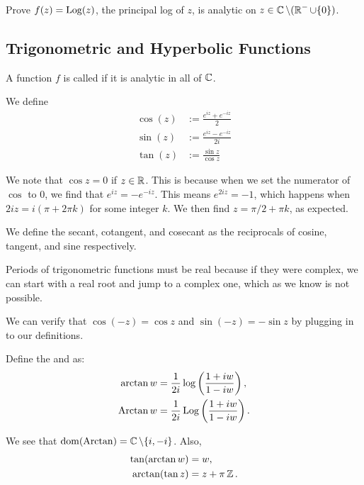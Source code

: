 \documentclass[notes]{subfile}
\begin{document}
\begin{exercise}
    Prove $f(z) = {\operatorname{Log}}(z)$, the principal log of $z$, is analytic on $z \in \operatorname{\mathbb{C}} \setminus (\operatorname{\mathbb{R}}^- \cup \{0\})$.
\end{exercise}

\subsection{Trigonometric and Hyperbolic Functions}

\begin{definition}
    A function $f$ is called  if it is analytic in all of $\operatorname{\mathbb{C}}$.
\end{definition}

We define
\begin{align*}
    \cos (z) &:= \frac{e^{iz} + e^{-iz}}{2} \\
    \sin (z) &:= \frac{e^{iz} - e^{-iz}}{2i} \\
    \tan (z) &:= \frac{\sin z}{\cos z}
\end{align*}


\noindent 
We note that $\cos z = 0$ if $z \in \operatorname{\mathbb{R}}$.  This is because when we set the numerator of $\cos$ to $0$, we find
that $e^{iz} = -e^{-iz}$. 
This means $e^{2iz} = -1$, which happens when $2iz = i(\pi + 2\pi k)$ for some integer $k$.
We then find $z = \pi/2 + \pi k$, as expected.


\noindent
We define the secant, cotangent, and cosecant as the reciprocals of cosine, tangent, and sine respectively.

\noindent
Periods of trigonometric functions must be real because if they were complex, we can start with a real root and jump to a complex one, which as we know is not possible.

\noindent
We can verify that $\cos (-z) = \cos z$ and $\sin (-z) = -\sin z$ by plugging in to our definitions.

\begin{definition}
    Define the  and 
     as:
    \begin{align*}
        \arctan w &= \frac{1}{2i} \log \left( \frac{1 + iw}{1 - iw}\right), \\
        \operatorname{Arctan} w &= \frac{1}{2i} \operatorname{Log} \left( \frac{1 + iw}{1 - iw}\right).
    \end{align*}
\end{definition}
We see that $\operatorname{dom} (\operatorname{Arctan}) = \operatorname{\mathbb{C}} \setminus \{i, -i\}$.
Also,
\begin{align*}
    \tan( \arctan w ) &= w, \\
    \arctan( \tan z ) &= z + \pi \operatorname{\mathbb{Z}}.
\end{align*}
\end{document}
